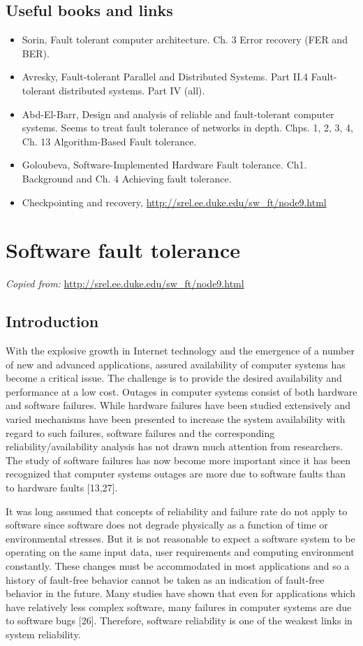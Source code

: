 \documentclass[oneside, a4paper, 11pt]{memoir}
\begin{document}
\section{Useful books and links}
\begin{itemize}
\item Sorin, Fault tolerant computer architecture. Ch. 3 Error recovery (FER and BER).
\item Avresky, Fault-tolerant Parallel and Distributed Systems. Part II.4 Fault-tolerant distributed systems. Part IV (all).
\item Abd-El-Barr, Design and analysis of reliable and fault-tolerant computer systems. Seems to treat fault tolerance of networks in depth. Chps. 1, 2, 3, 4, Ch. 13 Algorithm-Based Fault tolerance.
\item Goloubeva, Software-Implemented Hardware Fault tolerance. Ch1. Background and Ch. 4 Achieving fault tolerance.
\item Checkpointing and recovery, \url{http://srel.ee.duke.edu/sw_ft/node9.html}
\end{itemize}

\newpage
\chapter{Software fault tolerance}
\textit{Copied from:} \url{http://srel.ee.duke.edu/sw_ft/node9.html}
\section{Introduction}
With the explosive growth in Internet technology and the emergence of a number of new and advanced applications, assured availability of computer systems has become a critical issue. The challenge is to provide the desired availability and performance at a low cost.
Outages in computer systems consist of both hardware and software failures. While hardware failures have been studied extensively and varied mechanisms have been presented to increase the system availability with regard to such failures, software failures and the corresponding reliability/availability analysis has not drawn much attention from researchers. The study of software failures has now become more important since it has been recognized that computer systems outages are more due to software faults than to hardware faults [13,27].

It was long assumed that concepts of reliability and failure rate do not apply to software since software does not degrade physically as a function of time or environmental stresses. But it is not reasonable to expect a software system to be operating on the same input data, user requirements and computing environment constantly. These changes must be accommodated in most applications and so a history of fault-free behavior cannot be taken as an indication of fault-free behavior in the future. Many studies have shown that even for applications which have relatively less complex software, many failures in computer systems are due to software bugs [26]. Therefore, software reliability is one of the weakest links in system reliability.
\end{document}

